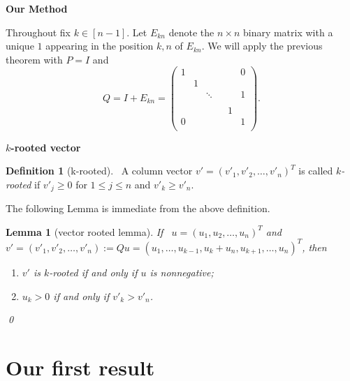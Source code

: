 \documentclass{article}
\theoremstyle{plain}
\newtheorem{lem}[thm]{Lemma}
\theoremstyle{definition}
\newtheorem{defn}[thm]{Definition}
\begin{document}
{\bf Our Method}


 Throughout fix $k\in [n-1]$. Let $E_{kn}$ denote the $n\times n$ binary matrix with a unique $1$ appearing in the  position $k,n$ of $E_{kn}$. We will apply the previous theorem with $P=I$ and $$Q=I+E_{kn}=\begin{pmatrix}
1 &  & & &  & 0 \\
 & 1 &  &      &  &  \\
 &  & \ddots & &  & 1 \\
 &  &        & &  &  \\
  &  & & & 1 &  \\
0 &  & & &  & 1 \\
\end{pmatrix}.$$



{\bf $k$-rooted vector}

\begin{defn}[k-rooted]
 ~A column vector $v'=(v'_1,v'_2,\ldots,v'_n)^T$ is called {\it $k$-rooted}  if $v'_{j} \geq 0$ for $1 \leq  j \leq n$ and $v'_k\geq v'_n.$
\end{defn}
\bigskip

The following Lemma is immediate from the above definition.
\bigskip

\begin{lem}[vector rooted lemma]
If ~$u=(u_1, u_2, \ldots, u_n)^T$ and $v'=(v'_1, v'_2, \ldots, v'_n):=Qu=(u_1,\ldots, u_{k-1},u_k+u_n, u_{k+1}, \ldots,  u_n)^T$, then
\begin{enumerate}
\item[(i)] $v'$ is $k$-rooted  if and only if  $u$ is nonnegative;
\item[(ii)] $u_k>0$ if and only if $v'_k>v'_n$.
\end{enumerate}
\qed
\end{lem}



\section{Our first result}
\end{document}
